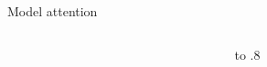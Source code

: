 \documentclass[aspectratio=169]{beamer}
\begin{document}
\begin{frame}{Model attention}
\begin{columns}[T]
\begin{column}{0.8\textwidth}
{\begin{tabular}{c c c c c}
        \end{tabular}
    \vfill}\end{column}
    \begin{column}{0.2\textwidth}\vbox to .8\end{column}
    \end{columns}
\end{frame}
\end{document}
